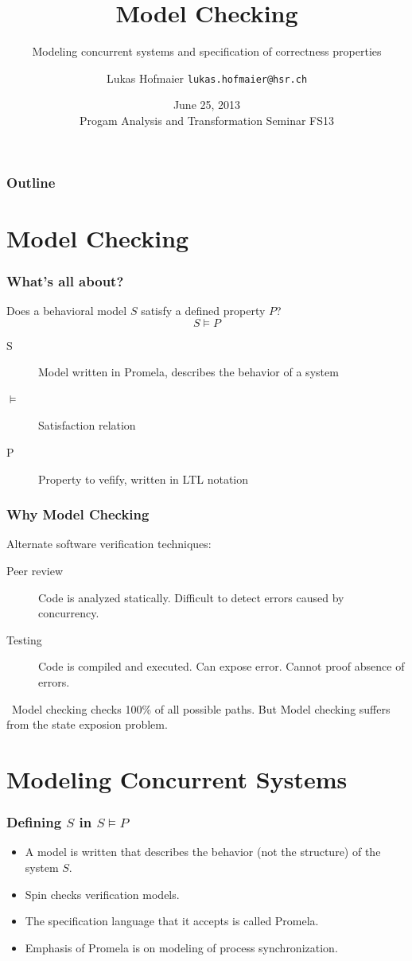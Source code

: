 \documentclass{beamer}
\title{Model Checking}
\subtitle{Modeling concurrent systems and specification of correctness properties}
\author{Lukas Hofmaier \texttt{lukas.hofmaier@hsr.ch}}
\date{June 25, 2013 \\ Progam Analysis and Transformation Seminar FS13}
\begin{document}
\maketitle
\begin{frame}
  \frametitle{Outline}
  \tableofcontents
\end{frame}

\section{Model Checking}

\begin{frame}
  \frametitle{What's all about?}
  Does a behavioral model $S$ satisfy a defined property $P$?
  \[
  S \models P
  \]
  \begin{description}
  \item[S] Model written in Promela, describes the behavior of a system
  \item[$\models$] Satisfaction relation
  \item[P] Property to vefify, written in LTL notation
  \end{description}
\end{frame}

\begin{frame}
  \frametitle{Why Model Checking}
Alternate software verification techniques:
  \begin{description}
  \item[Peer review] Code is analyzed statically. Difficult to detect errors caused by concurrency.
  \item[Testing] Code is compiled and executed. Can expose error. Cannot proof absence of errors.
  \end{description}\
Model checking checks 100\% of all possible paths. But Model checking suffers from the state exposion problem.
\end{frame}

\section{Modeling Concurrent Systems}

\begin{frame}
  \frametitle{  Defining $S$ in $S \models P$}

  \begin{itemize}
  \item A model is written that describes the behavior (not the structure) of the system $S$.
  \item Spin checks verification models.
  \item The specification language that it accepts is called Promela.
  \item Emphasis of Promela is on modeling of process synchronization.
  \end{itemize}
\end{frame}
\end{document}
